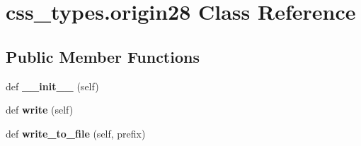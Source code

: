 \hypertarget{classcss__types_1_1origin28}{}\section{css\+\_\+types.\+origin28 Class Reference}
\label{classcss__types_1_1origin28}
\subsection*{Public Member Functions}
\begin{DoxyCompactItemize}
\item 
\hypertarget{classcss__types_1_1origin28_a50923bb11e410fe1eb2298a6175dffd1}{}def {\bfseries \+\_\+\+\_\+init\+\_\+\+\_\+} (self)\label{classcss__types_1_1origin28_a50923bb11e410fe1eb2298a6175dffd1}

\item 
\hypertarget{classcss__types_1_1origin28_a9dbd3347256622efe025e88fd7f1bb9f}{}def {\bfseries write} (self)\label{classcss__types_1_1origin28_a9dbd3347256622efe025e88fd7f1bb9f}

\item 
\hypertarget{classcss__types_1_1origin28_a6d69e78e7253f3c23cc648f6d7dae9b6}{}def {\bfseries write\+\_\+to\+\_\+file} (self, prefix)\label{classcss__types_1_1origin28_a6d69e78e7253f3c23cc648f6d7dae9b6}

\end{DoxyCompactItemize}
